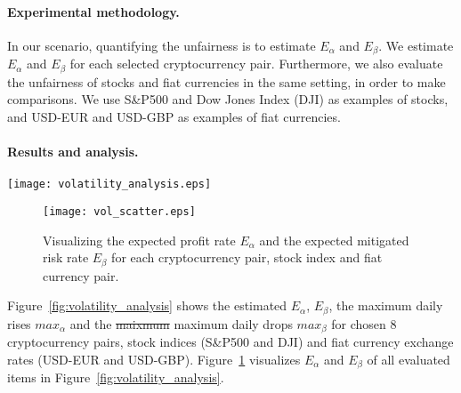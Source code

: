 \paragraph{Experimental methodology.}
In our scenario, quantifying the unfairness is to estimate $E_{\alpha}$ and $E_{\beta}$.
We estimate $E_{\alpha}$ and $E_{\beta}$ for each selected cryptocurrency pair.
Furthermore,  we also evaluate the unfairness of stocks and fiat currencies in the same setting, in order to make comparisons.
We use S\&P500 and Dow Jones Index (DJI) as examples of stocks, and USD-EUR and USD-GBP as examples of fiat currencies.

\paragraph{Results and analysis.}

\begin{figure*}
    \texttt{[image: volatility\_analysis.eps]}
    \caption{The daily percentage changes for all selected cryptocurrency pairs, stock indices and fiat currency pairs over one year (from 03/05/2018 to 03/05/2019). For each figure, $E_{\alpha}$, $E_{\beta}$, $max_\alpha$ and $max_\beta$ are the expected profit rate, the expected mitigated risk rate, the maximum daily profit and the maximum daily mitigated risk, respectively.}
    \label{fig:volatility_analysis}
\end{figure*}

\begin{figure}
    \texttt{[image: vol\_scatter.eps]}
    \caption{Visualizing the expected profit rate $E_\alpha$ and the expected mitigated risk rate $E_\beta$ for each cryptocurrency pair, stock index and fiat currency pair.}
    \label{fig:vol_scatter}
\end{figure}

Figure~\ref{fig:volatility_analysis} shows the estimated $E_\alpha$, $E_\beta$, the maximum daily rises $max_\alpha$ and the \sout{maixmum} maximum  daily drops $max_\beta$ for chosen 8 cryptocurrency pairs, stock indices (S\&P500 and DJI) and fiat currency exchange rates (USD-EUR and USD-GBP).
Figure~\ref{fig:vol_scatter} visualizes $E_\alpha$ and $E_\beta$ of all evaluated items in Figure~\ref{fig:volatility_analysis}.

